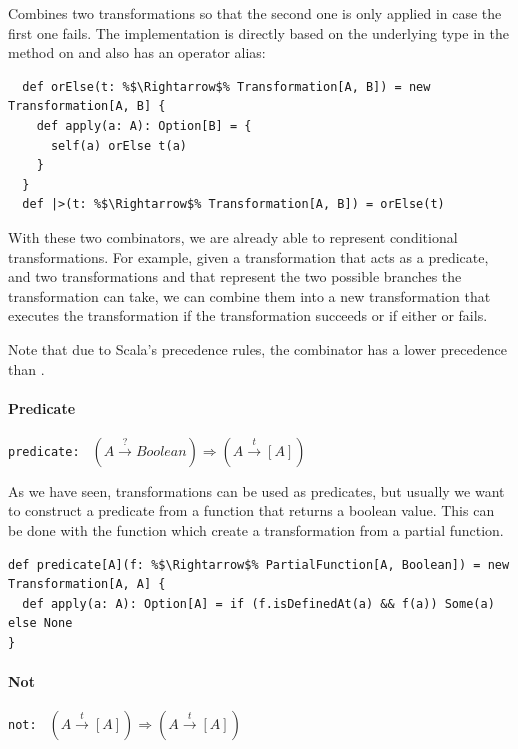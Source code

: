 \documentclass[10pt,a4paper,oneside]{scrreprt}
\begin{document}
\vspace{7pt} Combines two transformations so that the second one is only applied in case the first one fails. The implementation is directly based on the underlying  type in the  method on  and also has an operator alias:

\begin{lstlisting}
  def orElse(t: %$\Rightarrow$% Transformation[A, B]) = new Transformation[A, B] {
    def apply(a: A): Option[B] = {
      self(a) orElse t(a)
    }
  }
  def |>(t: %$\Rightarrow$% Transformation[A, B]) = orElse(t)
\end{lstlisting}

With these two combinators, we are already able to represent conditional transformations. For example, given a transformation  that acts as a predicate, and two transformations  and  that represent the two possible branches the transformation can take, we can combine them into a new transformation  that executes the  transformation if the  transformation succeeds or  if either  or  fails.

Note that due to Scala's precedence rules, the \src{|>} combinator has a lower precedence than \src{*>}.

\paragraph{Predicate} \hfill \lstinline{predicate: } $(A \overset{?}{\rightarrow} Boolean) \Rightarrow (A \overset{t}{\rightarrow} [A])$

\vspace{7pt} As we have seen, transformations can be used as predicates, but usually we want to construct a predicate from a function that returns a boolean value. This can be done with the  function which create a transformation from a partial function.

\begin{lstlisting}
def predicate[A](f: %$\Rightarrow$% PartialFunction[A, Boolean]) = new Transformation[A, A] {
  def apply(a: A): Option[A] = if (f.isDefinedAt(a) && f(a)) Some(a) else None
}
\end{lstlisting}

\paragraph{Not} \hfill \lstinline{not: } $(A \overset{t}{\rightarrow} [A]) \Rightarrow (A \overset{t}{\rightarrow} [A])$
\end{document}
